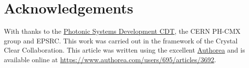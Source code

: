 \section*{Acknowledgements}
With thanks to the \href{https://www.photonicsystems.org/}{Photonic Systems Development CDT}, the CERN PH-CMX group and EPSRC. This work was carried out in the framework of the Crystal Clear Collaboration. This article was written using the excellent \href{www.authorea.com}{Authorea} and is available online at \href{https://www.authorea.com/users/695/articles/3692}{https://www.authorea.com/users/695/articles/3692}.